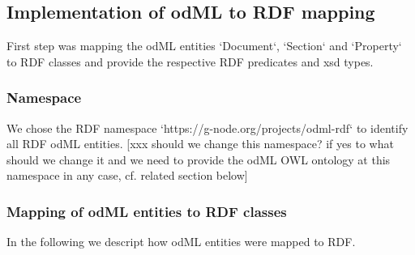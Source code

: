 \documentclass{article}
\begin{document}
\subsection{Implementation of odML to RDF mapping}

First step was mapping the odML entities `Document`, `Section` and `Property` to RDF classes and provide the respective RDF predicates and xsd types.

\subsubsection{Namespace}

We chose the RDF namespace `https://g-node.org/projects/odml-rdf` to identify all RDF odML entities. [xxx should we change this namespace? if yes to what should we change it and we need to provide the odML OWL ontology at this namespace in any case, cf. related section below]

\subsubsection{Mapping of odML entities to RDF classes}

In the following we descript how odML entities were mapped to RDF.
\end{document}
